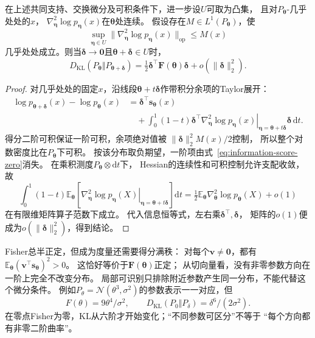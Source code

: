 \begin{theorem}[KL的局部二阶展开]
\label{thm:information-kl-local-fisher}
在上述共同支持、交换微分及可积条件下，进一步设\(U\)可取为凸集，
且对\(P_{\bm\theta}\)-几乎处处的\(x\)，
\(\nabla^2_{\bm\eta}\log p_{\bm\eta}(x)\)在\(\bm\theta\)处连续。
假设存在\(M\in L^1(P_{\bm\theta})\)，使
\[
  \sup_{\bm\eta\in U}
  \|\nabla^2_{\bm\eta}\log p_{\bm\eta}(x)\|_{\mathrm{op}}\leq M(x)
\]
几乎处处成立。则当\(\bm\delta\to\bm0\)且\(\bm\theta+\bm\delta\in U\)时，
\begin{equation}
  D_{\mathrm{KL}}(P_{\bm\theta}\Vert P_{\bm\theta+\bm\delta})
  =\tfrac12\bm\delta^\top\bm F(\bm\theta)\bm\delta
   +o(\|\bm\delta\|_2^2).
  \label{eq:information-kl-fisher-expansion}
\end{equation}
\end{theorem}
\begin{proof}
对几乎处处的固定\(x\)，沿线段\(\bm\theta+t\bm\delta\)作带积分余项的Taylor展开：
\[
\begin{aligned}
  \log p_{\bm\theta+\bm\delta}(x)-\log p_{\bm\theta}(x)
  &=\bm\delta^\top\bm s_{\bm\theta}(x)\\
  &\quad+\int_0^1(1-t)\bm\delta^\top
  \left.\nabla^2_{\bm\eta}\log p_{\bm\eta}(x)
  \right|_{\bm\eta=\bm\theta+t\bm\delta}
  \bm\delta\,\mathrm dt.
\end{aligned}
\]
得分二阶可积保证一阶可积，余项绝对值被
\(\|\bm\delta\|_2^2M(x)/2\)控制，
所以整个对数密度比在\(P_{\bm\theta}\)下可积。
按该分布取负期望，一阶项由式~\eqref{eq:information-score-zero}消失。
在乘积测度\(P_{\bm\theta}\otimes\mathrm dt\)下，
Hessian的连续性和可积控制允许支配收敛，故
\[
  \int_0^1(1-t)\mathbb E_{\bm\theta}
  \left[
    \left.\nabla^2_{\bm\eta}\log p_{\bm\eta}(X)
    \right|_{\bm\eta=\bm\theta+t\bm\delta}
  \right]\mathrm dt
  =\tfrac12\mathbb E_{\bm\theta}\nabla^2_{\bm\theta}
    \log p_{\bm\theta}(X)+o(1)
\]
在有限维矩阵算子范数下成立。
代入信息恒等式，左右乘\(\bm\delta^\top,\bm\delta\)，
矩阵的\(o(1)\)便成为\(o(\|\bm\delta\|_2^2)\)，得到结论。
\end{proof}

Fisher总半正定，但成为度量还需要得分满秩：
对每个\(\bm v\neq\bm0\)，都有
\(\mathbb E_{\bm\theta}(\bm v^\top\bm s_{\bm\theta})^2>0\)。
这恰好等价于\(\bm F(\bm\theta)\)正定；
从切向量看，没有非零参数方向在一阶上完全不改变分布。
局部可识别只排除附近参数产生同一分布，不能代替这个微分条件。
例如\(P_\theta=\mathcal N(\theta^3,\sigma^2)\)的参数表示一一对应，但
\[
  F(\theta)=9\theta^4/\sigma^2,\qquad
  D_{\mathrm{KL}}(P_0\Vert P_\delta)=\delta^6/(2\sigma^2).
\]
在零点Fisher为零，KL从六阶才开始变化；“不同参数可区分”不等于
“每个方向都有非零二阶曲率”。

